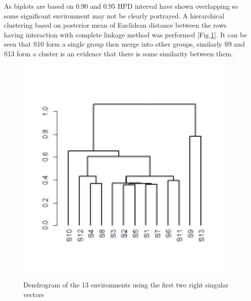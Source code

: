 As biplots are based on 0.90 and 0.95 HPD interval have shown overlapping so some significant environment may not be clearly portrayed. A hierarchical clustering based on posterior mean of Euclidean distance between the rows having interaction with complete linkage method was performed [Fig.\ref{Figure:4.15}]. It can be seen that S10 form a single group then merge into other groups, similarly S9 and S13 form a cluster is an evidence that there is some similarity between them.   
\begin{figure} [H]
	\centering  
	\scalebox{0.3}
	{\includegraphics[width=550mm]{02ThesisMain/Ch04RD/figures/column-cluster.pdf}}
	\caption[Bayesian dendrogram for environments]{Dendrogram of the 13 environments using the first two right singular vectors}
\label{Figure:4.15}
\end{figure}


